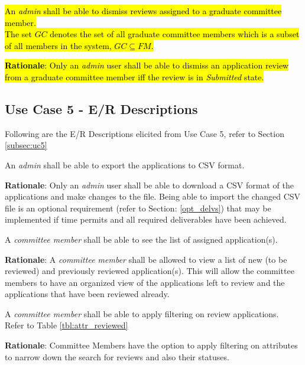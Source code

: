 \documentclass[fontsize=12pt,paper=letter,twoside]{scrartcl}
\begin{document}
\rdescription
{\hl{An \emph{admin} shall be able to dismiss reviews assigned to a graduate committee member.\\}}
{\hl{The set $GC$ denotes the set of all graduate committee members which is a subset of all members in the system, $GC \subseteq FM$.}}

\smallskip
\hl{\noindent \textbf{Rationale}: Only an \emph{admin} user shall be able to dismiss an application review from a graduate committee member iff the review is in \emph{Submitted} state.}


\subsection{Use Case 5 - E/R Descriptions}

Following are the E/R Descriptions elicited from Use Case 5, refer to Section \ref{subsec:uc5}

\genreq
{An \emph{admin} shall be able to export the applications to CSV format.\\}
{}
\label{R14}

\smallskip
\noindent \textbf{Rationale}: Only an \emph{admin} user shall be able to download a CSV format of the applications and make changes to the file. Being able to import the changed CSV file is an optional requirement (refer to Section: \ref{opt_delvs}) that may be implemented if time permits and all required deliverables have been achieved.

\genreq
{A \emph{committee member} shall be able to see the list of assigned application(s).\\}
{}
\label{R15}

\smallskip
\noindent \textbf{Rationale}: A \emph{committee member} shall be allowed to view a list of new (to be reviewed) and previously reviewed application(s). This will allow the committee members to have an organized view of the applications left to review and the applications that have been reviewed already.

\rdescription
{A \emph{committee member} shall be able to apply filtering on review applications.\\}
{Refer to Table \ref{tbl:attr_reviewed}}
\label{R16}

\smallskip
\noindent \textbf{Rationale}: Committee Members have the option to apply filtering on attributes to narrow down the search for reviews and also their statuses.
\end{document}
